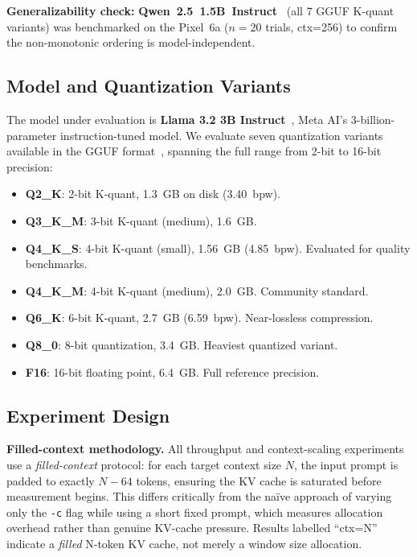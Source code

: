 \documentclass[conference]{IEEEtran}
\begin{document}
\textbf{Generalizability check:} \textbf{Qwen~2.5~1.5B~Instruct}~\cite{qwen25} (all 7 GGUF K-quant
variants) was benchmarked on the Pixel~6a ($n{=}20$ trials, ctx=256) to confirm the
non-monotonic ordering is model-independent.

\subsection{Model and Quantization Variants}

The model under evaluation is \textbf{Llama 3.2 3B Instruct}~\cite{llama32},
Meta AI's 3-billion-parameter instruction-tuned model. We evaluate seven quantization
variants available in the GGUF format~\cite{gguf}, spanning the full range from
2-bit to 16-bit precision:

\begin{itemize}
  \item \textbf{Q2\_K}: 2-bit K-quant, 1.3~GB on disk (3.40~bpw).
  \item \textbf{Q3\_K\_M}: 3-bit K-quant (medium), 1.6~GB.
  \item \textbf{Q4\_K\_S}: 4-bit K-quant (small), 1.56~GB (4.85~bpw). Evaluated for quality benchmarks.
  \item \textbf{Q4\_K\_M}: 4-bit K-quant (medium), 2.0~GB. Community standard.
  \item \textbf{Q6\_K}: 6-bit K-quant, 2.7~GB (6.59~bpw). Near-lossless compression.
  \item \textbf{Q8\_0}: 8-bit quantization, 3.4~GB. Heaviest quantized variant.
  \item \textbf{F16}: 16-bit floating point, 6.4~GB. Full reference precision.
\end{itemize}

\subsection{Experiment Design}

\textbf{Filled-context methodology.}
All throughput and context-scaling experiments use a \emph{filled-context} protocol:
for each target context size $N$, the input prompt is padded to exactly $N - 64$ tokens,
ensuring the KV cache is saturated before measurement begins.
This differs critically from the na\"ive approach of varying only the \texttt{-c} flag
while using a short fixed prompt, which measures allocation overhead rather than genuine
KV-cache pressure.
Results labelled ``ctx=N'' indicate a \emph{filled} N-token KV cache, not merely a window
size allocation.
\end{document}
